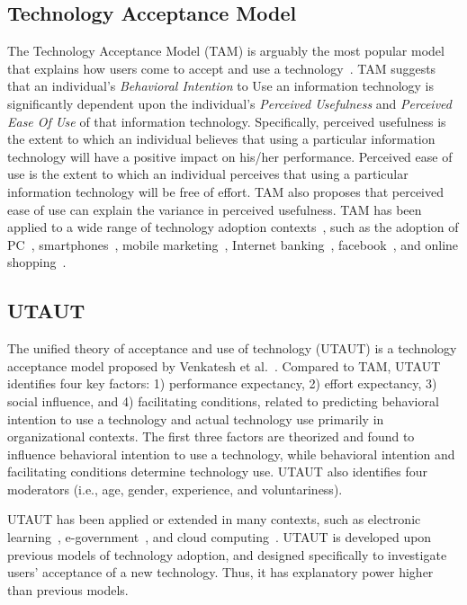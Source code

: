 \subsection{Technology Acceptance Model}
The Technology Acceptance Model (TAM) is arguably the most popular model that explains how users come to accept and use a technology~\cite{davis1989user}. TAM suggests that an individual's \textit{Behavioral Intention} to Use an information technology is significantly dependent upon the individual's \textit{Perceived Usefulness} and \textit{Perceived Ease Of Use} of that information technology. Specifically, perceived usefulness is the extent to which an individual believes that using a particular information technology will have a positive impact on his/her performance. Perceived ease of use is the extent to which an individual perceives that using a particular information technology will be free of effort. TAM also proposes that perceived ease of use can explain the variance in perceived usefulness.
TAM has been applied to a wide range of technology adoption contexts~\cite{wixom2005theoretical}, such as the adoption of PC~\cite{venkatesh2001longitudinal}, smartphones~\cite{park2007acceptance}, mobile marketing~\cite{bauer2005driving}, Internet banking~\cite{pikkarainen2004consumer}, facebook~\cite{lee2012effect, rauniar2014technology}, and online shopping~\cite{gefen2003trust}.

\subsection{UTAUT}
The unified theory of acceptance and use of technology (UTAUT) is a technology acceptance model proposed by Venkatesh et al.~\cite{venkatesh2003user}. Compared to TAM, UTAUT identifies four key factors: 1) performance expectancy, 2) effort expectancy, 3) social influence, and 4) facilitating conditions, related to predicting behavioral intention to use a technology and actual technology use primarily in organizational contexts. The first three factors are theorized and found to influence behavioral intention to use a technology, while behavioral intention and facilitating conditions determine technology use. UTAUT also identifies four moderators (i.e., age, gender, experience, and voluntariness).

UTAUT has been applied or extended in many contexts, such as electronic learning~\cite{wang2009interactive}, e-government~\cite{weerakkody2013examining}, and cloud computing~\cite{lian2015critical}. UTAUT is developed upon previous models of technology adoption, and designed specifically to investigate users’ acceptance of a new technology. Thus, it has explanatory power higher than previous models.

